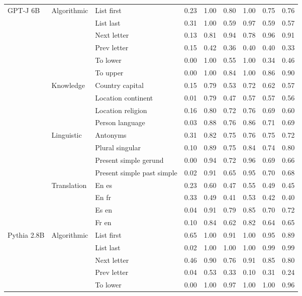\begin{center}
\begin{longtable}{lllrrrrrr}
\multirow[t]{18}{*}{GPT-J 6B} & \multirow[t]{6}{*}{Algorithmic} & List first & 0.23 & 1.00 & 0.80 & 1.00 & 0.75 & 0.76 \\
 &  & List last & 0.31 & 1.00 & 0.59 & 0.97 & 0.59 & 0.57 \\
 &  & Next letter & 0.13 & 0.81 & 0.94 & 0.78 & 0.96 & 0.91 \\
 &  & Prev letter & 0.15 & 0.42 & 0.36 & 0.40 & 0.40 & 0.33 \\
 &  & To lower & 0.00 & 1.00 & 0.55 & 1.00 & 0.34 & 0.46 \\
 &  & To upper & 0.00 & 1.00 & 0.84 & 1.00 & 0.86 & 0.90 \\
\cline{2-9}
 & \multirow[t]{4}{*}{Knowledge} & Country capital & 0.15 & 0.79 & 0.53 & 0.72 & 0.62 & 0.57 \\
 &  & Location continent & 0.01 & 0.79 & 0.47 & 0.57 & 0.57 & 0.56 \\
 &  & Location religion & 0.16 & 0.80 & 0.72 & 0.76 & 0.69 & 0.60 \\
 &  & Person language & 0.03 & 0.88 & 0.76 & 0.86 & 0.71 & 0.69 \\
\cline{2-9}
 & \multirow[t]{4}{*}{Linguistic} & Antonyms & 0.31 & 0.82 & 0.75 & 0.76 & 0.75 & 0.72 \\
 &  & Plural singular & 0.10 & 0.89 & 0.75 & 0.84 & 0.74 & 0.80 \\
 &  & Present simple gerund & 0.00 & 0.94 & 0.72 & 0.96 & 0.69 & 0.66 \\
 &  & Present simple past simple & 0.02 & 0.91 & 0.65 & 0.95 & 0.70 & 0.68 \\
\cline{2-9}
 & \multirow[t]{4}{*}{Translation} & En es & 0.23 & 0.60 & 0.47 & 0.55 & 0.49 & 0.45 \\
 &  & En fr & 0.33 & 0.49 & 0.41 & 0.53 & 0.42 & 0.40 \\
 &  & Es en & 0.04 & 0.91 & 0.79 & 0.85 & 0.70 & 0.72 \\
 &  & Fr en & 0.10 & 0.84 & 0.62 & 0.82 & 0.64 & 0.65 \\
\cline{1-9} \cline{2-9}
\multirow[t]{18}{*}{Pythia 2.8B} & \multirow[t]{6}{*}{Algorithmic} & List first & 0.65 & 1.00 & 0.91 & 1.00 & 0.95 & 0.89 \\
 &  & List last & 0.02 & 1.00 & 1.00 & 1.00 & 0.99 & 0.99 \\
 &  & Next letter & 0.46 & 0.90 & 0.76 & 0.91 & 0.85 & 0.80 \\
 &  & Prev letter & 0.04 & 0.53 & 0.33 & 0.10 & 0.31 & 0.24 \\
 &  & To lower & 0.00 & 1.00 & 0.97 & 1.00 & 1.00 & 0.96 \\

\end{longtable}
\end{center}
